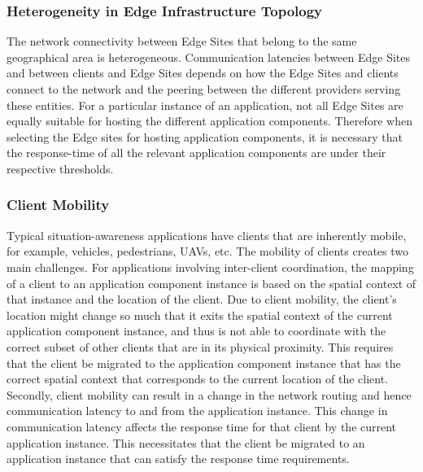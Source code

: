 \subsubsection{Heterogeneity in Edge Infrastructure Topology}
The network connectivity between Edge Sites that belong to the same geographical area is heterogeneous. Communication latencies between Edge Sites and between clients and Edge Sites depends on how the Edge Sites and clients connect to the network and the peering between the different providers serving these entities. For a particular instance of an application, not all Edge Sites are equally suitable for hosting the different application components. Therefore when selecting the Edge sites for hosting application components, it is necessary that the response-time of all the relevant application components are under their respective thresholds.

\subsubsection{Client Mobility}
Typical situation-awareness applications have clients that are inherently mobile, for example, vehicles, pedestrians, UAVs, etc. The mobility of clients creates two main challenges. For applications involving inter-client coordination, the mapping of a client to an application component instance is based on the spatial context of that instance and the location of the client. Due to client mobility, the client's location might change so much that it exits the spatial context of the current application component instance, and thus is not able to coordinate with the correct subset of other clients that are in its physical proximity. This requires that the client be migrated to the application component instance that has the correct spatial context that corresponds to the current location of the client. Secondly, client mobility can result in a change in the network routing and hence communication latency to and from the application instance. This change in communication latency affects the response time for that client by the current application instance. This necessitates that the client be migrated to an application instance that can satisfy the response time requirements.

